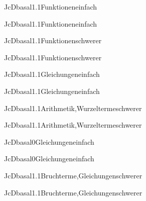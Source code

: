 \documentclass[12pt]{article}
\begin{document}
\begin{Add}{JcD}{basal1.1}{Funktionen}{einfach}
\solution{ }
\end{Add}
\begin{Add}{JcD}{basal1.1}{Funktionen}{einfach}
\end{Add}

        \begin{Add}{JcD}{basal1.1}{Funktionen}{schwerer}
        \solution{ }
        \end{Add}
        \begin{Add}{JcD}{basal1.1}{Funktionen}{schwerer}
        \end{Add}
        

\begin{Add}{JcD}{basal1.1}{Gleichungen}{einfach}
\solution{ }
\end{Add}
\begin{Add}{JcD}{basal1.1}{Gleichungen}{einfach}
\end{Add}

\begin{Add}{JcD}{basal1.1}{Arithmetik,Wurzelterme}{schwerer}
\solution{ }
\end{Add}
\begin{Add}{JcD}{basal1.1}{Arithmetik,Wurzelterme}{schwerer}
\end{Add}

\begin{Add}{JcD}{basal0}{Gleichungen}{einfach}
\solution{ }
\end{Add}
\begin{Add}{JcD}{basal0}{Gleichungen}{einfach}
\end{Add}

\begin{Add}{JcD}{basal1.1}{Bruchterme,Gleichungen}{schwerer}
\solution{ }
\end{Add}
\begin{Add}{JcD}{basal1.1}{Bruchterme,Gleichungen}{schwerer}
\end{Add}
\end{document}
